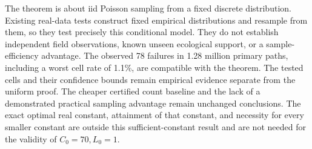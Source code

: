 \documentclass[11pt]{article}
\begin{document}
The theorem is about iid Poisson sampling from a fixed discrete
distribution. Existing real-data tests construct fixed empirical
distributions and resample from them, so they test precisely this
conditional model. They do not establish independent field observations,
known unseen ecological support, or a sample-efficiency advantage.
The observed 78 failures in 1.28 million primary paths, including a worst
cell rate of 1.1\%, are compatible with the theorem. The tested cells and
their confidence bounds remain empirical evidence separate from the
uniform proof. The cheaper certified count baseline and the lack of a
demonstrated practical sampling advantage remain unchanged conclusions.
The exact optimal real constant, attainment of that constant, and
necessity for every smaller constant are outside this sufficient-constant
result and are not needed for the validity of $C_0=70,L_0=1$.
\end{document}
